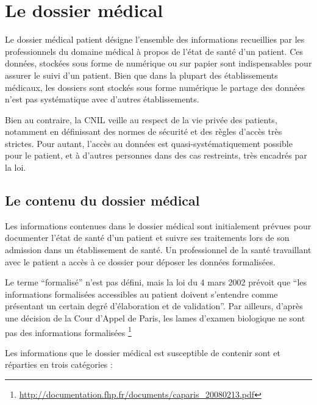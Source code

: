    \section{Le dossier médical}

    Le dossier médical patient désigne l'ensemble des informations recueillies par les professionnels du 
    domaine médical à propos de l'état de santé d'un patient. Ces données, stockées sous forme de
    numérique ou sur papier sont indispensables pour assurer le suivi d'un patient. Bien que
    dans la plupart des établissements médicaux, les dossiers sont stockés sous forme numérique
    le partage des données n'est pas systématique avec d'autres établissements.
    
    Bien au contraire, 
    la CNIL veille au respect de la vie privée des patients, notamment en définissant des normes de
    sécurité et des règles d'accès très strictes. Pour autant, l'accès au données est quasi-systématiquement possible pour le patient, et à d'autres
    personnes dans des cas restreints, très encadrés par la loi.

\subsection{Le contenu du dossier médical}

Les informations contenues dans le dossier médical sont initialement prévues pour documenter l'état de
santé d'un patient et suivre ses traitements lors de son admission dans un établissement de santé.
Un professionnel de la santé travaillant avec le patient a accès à ce dossier pour déposer les données 
formalisées.

Le terme ``formalisé'' n'est pas défini, mais la loi du 4 mars 2002 prévoit que ``les
informations formalisées accessibles au patient doivent s'entendre comme présentant un certain degré d'élaboration et de validation''. Par ailleurs, d'après une décision de la Cour d'Appel de Paris, les lames d'examen biologique ne sont pas des informations formalisées \footnote{\url{http://documentation.fhp.fr/documents/caparis_20080213.pdf}}

Les informations que le dossier médical est susceptible de contenir sont
et réparties en trois catégories :

